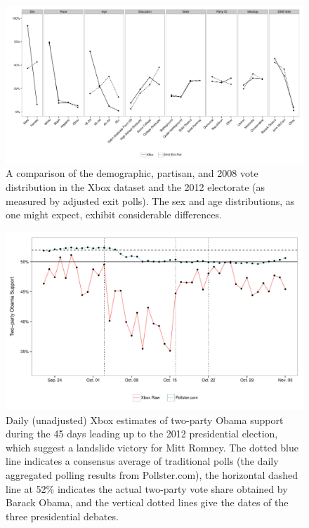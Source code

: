 \documentclass[preprint,authoryear,12pt]{elsarticle}
\begin{document}

\begin{figure}
  \centering
  \includegraphics[width=\textwidth]{"xbox_electorate_demo_comp"}
  \caption{A comparison of the demographic, partisan, and 2008 vote
    distribution in the Xbox dataset and the 2012 electorate (as
    measured by adjusted exit polls). The sex and age distributions, as one might expect, exhibit
  considerable differences.}
  \label{fig:demo_comp}
\end{figure}

\begin{figure}
  \centering
  \includegraphics[width=.8\textwidth]{"raw_response"}
  \caption{Daily (unadjusted) Xbox estimates of two-party Obama support during
    the 45 days leading up to the 2012 presidential election, which suggest a
    landslide victory for Mitt Romney. The dotted blue line indicates a
    consensus average of traditional polls (the daily aggregated polling results from Pollster.com), the horizontal dashed line at 52\%
    indicates the actual two-party vote share obtained by Barack Obama, and the
    vertical dotted lines give the dates of the three presidential debates.}
  \label{fig:raw_responses}
\end{figure}
\end{document}

